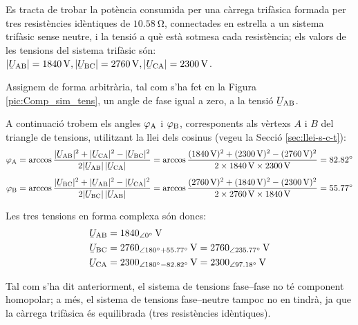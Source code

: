 \begin{exemple}
    Es tracta de trobar la pot\`{e}ncia consumida per una c\`{a}rrega trif\`{a}sica
    formada per tres resist\`{e}ncies id\`{e}ntiques de $\SI{10,58}{\ohm}$,
    connectades en estrella a un sistema trif\`{a}sic sense neutre, i la
    tensi\'{o} a qu\`{e} est\`{a} sotmesa cada resist\`{e}ncia; els valors de les
    tensions del sistema trif\`{a}sic s\'{o}n: $|\cmplx{U}\ped{AB}| =
    \SI{1840}{V}, |\cmplx{U}\ped{BC}| = \SI{2760}{V},
    |\cmplx{U}\ped{CA}| = \SI{2300}{V}$.

    Assignem de forma arbitr\`{a}ria, tal com s'ha fet en la Figura
    \vref{pic:Comp_sim_tens}, un angle de fase igual a zero, a la tensi\'{o}
    $\cmplx{U}\ped{AB}$.

    A continuaci\'{o} trobem els angles $\varphi_\mathrm{A}$ i $\varphi_\mathrm{B}$,
    corresponents als v\`{e}rtexs  $A$ i $B$ del triangle de
    tensions, utilitzant la llei dels cosinus (vegeu la Secci\'{o}
    \vref{sec:llei-s-c-t}): 
    \begin{align*}
        \varphi\ped{A} &= \arccos \frac{|\cmplx{U}\ped{AB}|^2 + |\cmplx{U}\ped{CA}|^2 -
        |\cmplx{U}\ped{BC}|^2}{2 |\cmplx{U}\ped{AB}| \,|\cmplx{U}\ped{CA}|} =
        \arccos \frac{(\SI{1840}{V})^2 + (\SI{2300}{V})^2 - (\SI{2760}{V})^2}{2 \times \SI{1840}{V}
        \times \SI{2300}{V}} = \ang{82,82} \\[1ex]
        \varphi\ped{B} &= \arccos \frac{|\cmplx{U}\ped{BC}|^2 + |\cmplx{U}\ped{AB}|^2 -
        |\cmplx{U}\ped{CA}|^2}{2 |\cmplx{U}\ped{BC}| \,|\cmplx{U}\ped{AB}|} =
        \arccos \frac{(\SI{2760}{V})^2 + (\SI{1840}{V})^2 - (\SI{2300}{V})^2}{2 \times \SI{2760}{V}
        \times \SI{1840}{V}} = \ang{55,77}
    \end{align*}

    Les tres tensions en forma complexa s\'{o}n doncs:
    \begin{align*}
    \cmplx{U}\ped{AB} &= \SIpd{1840}{0}{V} \\
    \cmplx{U}\ped{BC} &= \num{2760}_{\angle\ang{180} + \ang{55,77}}\unit{V} =
    \SIpd{2760}{235,77}{V} \\
    \cmplx{U}\ped{CA} &= \num{2300}_{\angle\ang{180} - \ang{82,82}}\unit{V} = \SIpd{2300}{97,18}{V}
    \end{align*}

    Tal com s'ha dit anteriorment, el sistema de tensions fase--fase no
    t\'{e} component homopolar; a m\'{e}s, el sistema de tensions fase--neutre
    tampoc no en tindr\`{a}, ja que la c\`{a}rrega trif\`{a}sica \'{e}s equilibrada
    (tres resist\`{e}ncies id\`{e}ntiques).


\end{exemple}
